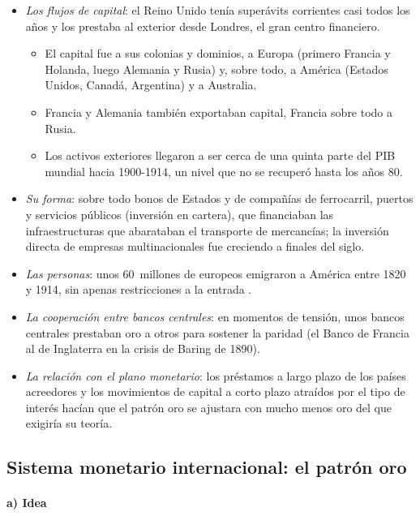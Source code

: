 \documentclass[11pt]{article}
\begin{document}
\begin{itemize}
\item \emph{Los flujos de capital}: el Reino Unido tenía superávits corrientes casi todos los años y los prestaba al exterior desde Londres, el gran centro financiero.
  \begin{itemize}
  \item El capital fue a sus colonias y dominios, a Europa (primero Francia y Holanda, luego Alemania y Rusia) y, sobre todo, a América (Estados Unidos, Canadá, Argentina) y a Australia.
  \item Francia y Alemania también exportaban capital, Francia sobre todo a Rusia.
  \item Los activos exteriores llegaron a ser cerca de una quinta parte del PIB mundial hacia 1900-1914, un nivel que no se recuperó hasta los años 80\nocite{ObstfeldTaylor2004Global}.
  \end{itemize}
\item \emph{Su forma}: sobre todo bonos de Estados y de compañías de ferrocarril, puertos y servicios públicos (inversión en cartera), que financiaban las infraestructuras que abarataban el transporte de mercancías; la inversión directa de empresas multinacionales fue creciendo a finales del siglo.
\item \emph{Las personas}: unos 60~millones de europeos emigraron a América entre 1820 y 1914, sin apenas restricciones a la entrada\nocite{HattonWilliamson1998Mass} .
\item \emph{La cooperación entre bancos centrales}: en momentos de tensión, unos bancos centrales prestaban oro a otros para sostener la paridad (el Banco de Francia al de Inglaterra en la crisis de Baring de 1890).
\item \emph{La relación con el plano monetario}: los préstamos a largo plazo de los países acreedores y los movimientos de capital a corto plazo atraídos por el tipo de interés hacían que el patrón oro se ajustara con mucho menos oro del que exigiría su teoría\nocite{Eichengreen2019Globalizing}.
\end{itemize}

\subsection{Sistema monetario internacional: el patrón oro}\label{sec:patron-oro}

\paragraph{a) Idea}
\end{document}
